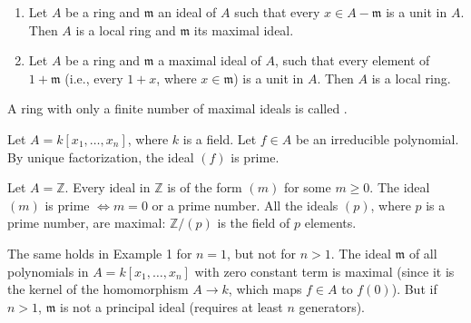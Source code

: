 
\begin{prop}
    \begin{enumerate}[label=\textnormal{(\roman*)}]
        \item Let \( A \) be a ring and \( \mathfrak{m} \) an ideal of \( A \) such that every \( x \in A - \mathfrak{m} \) is a unit in \( A \). Then \( A \) is a local ring and \( \mathfrak{m} \) its maximal ideal.
        \item Let \( A \) be a ring and \( \mathfrak{m} \) a maximal ideal of \( A \), such that every element of \( 1 + \mathfrak{m} \) (i.e., every \( 1 + x \), where \( x \in \mathfrak{m} \)) is a unit in \( A \). Then \( A \) is a local ring.
    \end{enumerate}
\end{prop}
A ring with only a finite number of maximal ideals is called .

\begin{eg}
Let \( A = k[x_1, \ldots, x_n] \), where \( k \) is a field. Let \( f \in A \) be an irreducible polynomial. By unique factorization, the ideal \( (f) \) is prime.
\end{eg}

\begin{eg}
Let \( A = \mathbb{Z} \). Every ideal in \( \mathbb{Z} \) is of the form \( (m) \) for some \( m \ge 0 \). The ideal \( (m) \) is prime \( \Leftrightarrow m = 0 \) or a prime number. All the ideals \( (p) \), where \( p \) is a prime number, are maximal: \( \mathbb{Z}/(p) \) is the field of \( p \) elements.
\end{eg}

\begin{remark}
The same holds in Example 1 for \( n = 1 \), but not for \( n > 1 \). 
The ideal \( \mathfrak{m} \) of all polynomials in \( A = k[x_1, 
\ldots, x_n] \) with zero constant term is maximal (since it is the 
kernel of the homomorphism \( A \to k \), which maps \( f \in A \) to 
\( f(0) \)). But if \( n > 1 \), \( \mathfrak{m} \) is not a principal
 ideal (requires at least \( n \) generators).
\end{remark}

